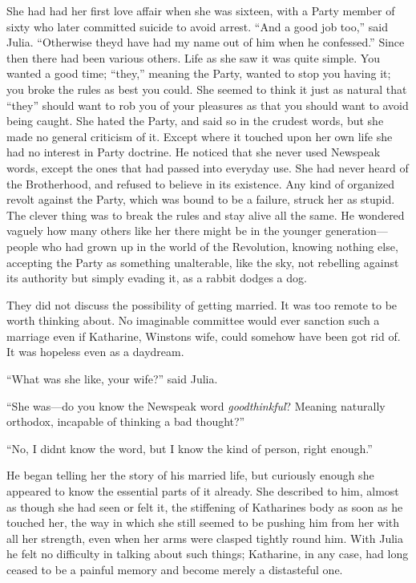 She had had her first love affair when she was sixteen, with a Party
member of sixty who later committed suicide to avoid arrest. ``And a good
job too,'' said Julia. ``Otherwise they\textquotesingle d have had my name
out of him when he confessed.'' Since then there had been various others.
Life as she saw it was quite simple. You wanted a good time; ``they,''
meaning the Party, wanted to stop you having it; you broke the rules as
best you could. She seemed to think it just as natural that ``they''
should want to rob you of your pleasures as that you should want to
avoid being caught. She hated the Party, and said so in the crudest
words, but she made no general criticism of it. Except where it touched
upon her own life she had no interest in Party doctrine. He noticed that
she never used Newspeak words, except the ones that had passed into
everyday use. She had never heard of the Brotherhood, and refused to
believe in its existence. Any kind of organized revolt against the
Party, which was bound to be a failure, struck her as stupid. The clever
thing was to break the rules and stay alive all the same. He wondered
vaguely how many others like her there might be in the younger
generation---people who had grown up in the world of the Revolution,
knowing nothing else, accepting the Party as something unalterable, like
the sky, not rebelling against its authority but simply evading it, as a
rabbit dodges a dog.

They did not discuss the possibility of getting married. It was too
remote to be worth thinking about. No imaginable committee would ever
sanction such a marriage even if Katharine, Winston\textquotesingle s
wife, could somehow have been got rid of. It was hopeless even as a
daydream.

``What was she like, your wife?'' said Julia.

``She was---do you know the Newspeak word \emph{goodthinkful}? Meaning
naturally orthodox, incapable of thinking a bad thought?''

``No, I didn\textquotesingle t know the word, but I know the kind of
person, right enough.''

He began telling her the story of his married life, but curiously enough
she appeared to know the essential parts of it already. She described to
him, almost as though she had seen or felt it, the stiffening of
Katharine\textquotesingle s body as soon as he touched her, the way in
which she still seemed to be pushing him from her with all her strength,
even when her arms were clasped tightly round him. With Julia he felt no
difficulty in talking about such things; Katharine, in any case, had
long ceased to be a painful memory and become merely a distasteful one.

